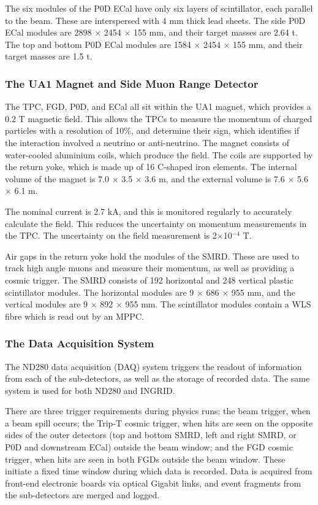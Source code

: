 The six modules of the P0D ECal have only six layers of scintillator, each parallel to the beam. These are interspersed with 4 mm thick lead sheets. The side P0D ECal modules are 2898 $\times$ 2454 $\times$ 155 mm, and their target masses are 2.64 t. The top and bottom P0D ECal modules are 1584 $\times$ 2454 $\times$ 155 mm, and their target masses are 1.5 t.

\subsubsection{The UA1 Magnet and Side Muon Range Detector}\label{sec:mag}

The TPC, FGD, P0D, and ECal all sit within the UA1\cite{UA1} magnet, which provides a 0.2 T magnetic field. This allows the TPCs to measure the momentum of charged particles with a resolution of 10$\%$, and determine their sign, which identifies if the interaction involved a neutrino or anti-neutrino. The magnet consists of water-cooled aluminium coils, which produce the field. The coils are supported by the return yoke, which is made up of 16 C-shaped iron elements. The internal volume of the magnet is 7.0 $\times$ 3.5 $\times$ 3.6 m, and the external volume is 7.6 $\times$ 5.6 $\times$ 6.1 m.

The nominal current is 2.7 kA, and this is monitored regularly to accurately calculate the field. This reduces the uncertainty on momentum measurements in the TPC. The uncertainty on the field measurement is 2$\times$10$^{-4}$ T.

Air gaps in the return yoke hold the modules of the SMRD. These are used to track high angle muons and measure their momentum, as well as providing a cosmic trigger. The SMRD consists of 192 horizontal and 248 vertical plastic scintillator modules. The horizontal modules are 9 × 686 × 955 mm, and the vertical modules are 9 × 892 × 955 mm. The scintillator modules contain a WLS fibre which is read out by an MPPC.

\subsubsection{The Data Acquisition System}\label{sec:daq}

The ND280 data acquisition (DAQ) system triggers the readout of information from each of the sub-detectors, as well as the storage of recorded data. The same system is used for both ND280 and INGRID.

There are three trigger requirements during physics runs: the beam trigger, when a beam spill occurs; the Trip-T cosmic trigger, when hits are seen on the opposite sides of the outer detectors (top and bottom SMRD, left and right SMRD, or P0D and downstream ECal) outside the beam window; and the FGD cosmic trigger, when hits are seen in both FGDs outside the beam window. These initiate a fixed time window during which data is recorded. Data is acquired from front-end electronic boards via optical Gigabit links, and event fragments from the sub-detectors are merged and logged.


